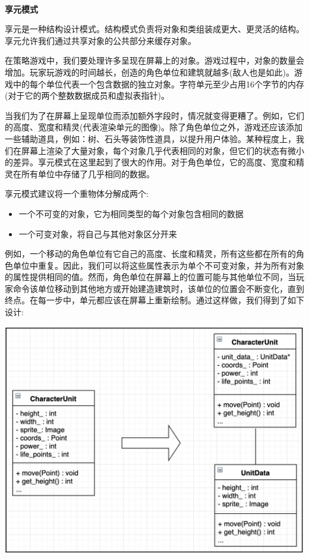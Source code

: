 \noindent\textbf{}\ \par
\textbf{享元模式} \ \par
享元是一种结构设计模式。结构模式负责将对象和类组装成更大、更灵活的结构。享元允许我们通过共享对象的公共部分来缓存对象。 \par
在策略游戏中，我们要处理许多呈现在屏幕上的对象。游戏过程中，对象的数量会增加。玩家玩游戏的时间越长，创造的角色单位和建筑就越多(敌人也是如此)。游戏中的每个单位代表一个包含数据的独立对象。字符单元至少占用16个字节的内存(对于它的两个整数数据成员和虚拟表指针)。 \par
当我们为了在屏幕上呈现单位而添加额外字段时，情况就变得更糟了。例如，它们的高度、宽度和精灵(代表渲染单元的图像)。除了角色单位之外，游戏还应该添加一些辅助道具，例如：树、石头等装饰性道具，以提升用户体验。某种程度上，我们在屏幕上渲染了大量对象，每个对象几乎代表相同的对象，但它们的状态有微小的差异。享元模式在这里起到了很大的作用。对于角色单位，它的高度、宽度和精灵在所有单位中存储了几乎相同的数据。 \par
享元模式建议将一个重物体分解成两个: \par

\begin{itemize}
	\item 一个不可变的对象，它为相同类型的每个对象包含相同的数据
	\item 一个可变对象，将自己与其他对象区分开来
\end{itemize}

例如，一个移动的角色单位有它自己的高度、长度和精灵，所有这些都在所有的角色单位中重复。因此，我们可以将这些属性表示为单个不可变对象，并为所有对象的属性提供相同的值。然而，角色单位在屏幕上的位置可能与其他单位不同，当玩家命令该单位移动到其他地方或开始建造建筑时，该单位的位置会不断变化，直到终点。在每一步中，单元都应该在屏幕上重新绘制。通过这样做，我们得到了如下设计: \par

\begin{center}
	\includegraphics[width=1.0\textwidth]{content/Section-2/Chapter-11/11}
\end{center}

